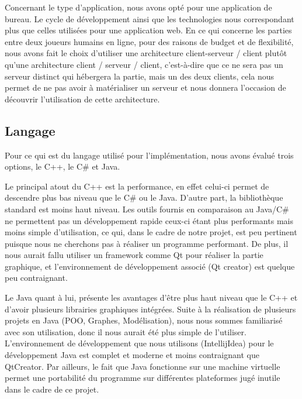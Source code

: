 \documentclass{article}
\begin{document}
Concernant le type d'application, nous avons opté pour une application de bureau. Le cycle de développement ainsi que les technologies nous correspondant plus que celles utilisées pour une application web. En ce qui concerne les parties entre deux joueurs humains en ligne, pour des raisons de budget et de flexibilité, nous avons fait le choix d'utiliser une architecture client-serveur / client plutôt qu'une architecture client / serveur / client, c'est-à-dire que ce ne sera pas un serveur distinct qui hébergera la partie, mais un des deux clients, cela nous permet de ne pas avoir à matérialiser un serveur et nous donnera l'occasion de découvrir l'utilisation de cette architecture.

\subsection{Langage}

Pour ce qui est du langage utilisé pour l'implémentation, nous avons évalué trois options, le C++, le C\# et Java.
\newline

Le principal atout du C++ est la performance, en effet celui-ci permet de descendre plus bas niveau que le C\# ou le Java. D'autre part, la bibliothèque standard est moins haut niveau. Les outils fournis en comparaison au Java/C\# ne permettent pas un développement rapide ceux-ci étant plus performants mais moins simple d'utilisation, ce qui, dans le cadre de notre projet, est peu pertinent puisque nous ne cherchons pas à réaliser un programme performant. De plus, il nous aurait fallu utiliser un framework comme Qt pour réaliser la partie graphique, et l'environnement de développement associé (Qt creator) est quelque peu contraignant.
\newline

Le Java quant à lui, présente les avantages d'être plus haut niveau que le C++  et d'avoir plusieurs librairies graphiques intégrées. Suite à la réalisation de plusieurs projets en Java (POO, Graphes, Modélisation), nous nous sommes familiarisé avec son utilisation, donc il nous aurait été plus simple de l'utiliser. L'environnement de développement que nous utilisons (IntellijIdea) pour le développement Java est complet et moderne et moins contraignant que QtCreator. Par ailleurs, le fait que Java fonctionne sur une machine virtuelle permet une portabilité du programme sur différentes plateformes jugé inutile dans le cadre de ce projet.
\newline
\end{document}
